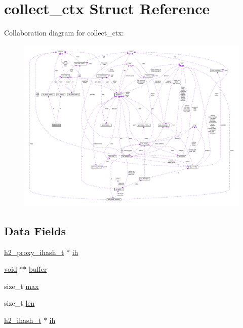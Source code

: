 \hypertarget{structcollect__ctx}{}\section{collect\+\_\+ctx Struct Reference}
\label{structcollect__ctx}


Collaboration diagram for collect\+\_\+ctx\+:
\nopagebreak
\begin{figure}[H]
\begin{center}
\leavevmode
\includegraphics[width=350pt]{structcollect__ctx__coll__graph}
\end{center}
\end{figure}
\subsection*{Data Fields}
\begin{DoxyCompactItemize}
\item 
\hyperlink{structh2__proxy__ihash__t}{h2\+\_\+proxy\+\_\+ihash\+\_\+t} $\ast$ \hyperlink{structcollect__ctx_af6b7ab1af49eb18323936cb1c87c24af}{ih}
\item 
\hyperlink{group__MOD__ISAPI_gacd6cdbf73df3d9eed42fa493d9b621a6}{void} $\ast$$\ast$ \hyperlink{structcollect__ctx_a15f378c811d0f91565c1180917ab813c}{buffer}
\item 
size\+\_\+t \hyperlink{structcollect__ctx_a1460bf3cf076102a575314dccd9c2225}{max}
\item 
size\+\_\+t \hyperlink{structcollect__ctx_ab02d7463f7bdb6f43f60180df467e844}{len}
\item 
\hyperlink{structh2__ihash__t}{h2\+\_\+ihash\+\_\+t} $\ast$ \hyperlink{structcollect__ctx_a8fea308a1b19498dd3cf159f5838398d}{ih}
\end{DoxyCompactItemize}



